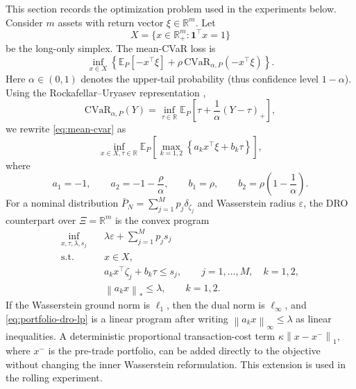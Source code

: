 \documentclass[11pt]{article}
\newcommand{\R}{\mathbb{R}}
\newcommand{\E}{\mathbb{E}}
\newcommand{\XiSet}{\Xi}
\newcommand{\1}{\mathbf{1}}
\newcommand{\Pbar}{\bar P_N}
\newcommand{\norm}[1]{\left\lVert #1\right\rVert}
\begin{document}
This section records the optimization problem used in the experiments below. Consider $m$ assets with return vector $\xi\in\R^m$. Let
\begin{equation}
    X=\{x\in\R_+^m:\mathbf 1^\top x=1\}
\end{equation}
be the long-only simplex. The mean-CVaR loss is
\begin{equation}\label{eq:mean-cvar}
\inf_{x\in X}\left\{\E_P[-x^\top\xi]+\rho\,\mathrm{CVaR}_{\alpha,P}(-x^\top\xi)\right\}.
\end{equation}
Here $\alpha\in(0,1)$ denotes the upper-tail probability (thus confidence level $1-\alpha$). Using the Rockafellar--Uryasev representation \citep{rockafellar2000optimization},
\begin{equation}
\mathrm{CVaR}_{\alpha,P}(Y)=\inf_{\tau\in\R}\E_P\left[\tau+\frac1\alpha(Y-\tau)_+\right],
\end{equation}
we rewrite \eqref{eq:mean-cvar} as
\begin{equation}\label{eq:portfolio-loss}
\inf_{x\in X,\tau\in\R}\E_P\left[\max_{k=1,2}\left\{a_k x^\top\xi+b_k\tau\right\}\right],
\end{equation}
where
\begin{equation}
    a_1=-1,
    \qquad
    a_2=-1-\frac{\rho}{\alpha},
    \qquad
    b_1=\rho,
    \qquad
    b_2=\rho\left(1-\frac1\alpha\right).
\end{equation}
For a nominal distribution $\Pbar=\sum_{j=1}^Mp_j\delta_{\zeta_j}$ and Wasserstein radius $\varepsilon$, the DRO counterpart over $\XiSet=\R^m$ is the convex program
\begin{equation}\label{eq:portfolio-dro-lp}
\begin{aligned}
\inf_{x,\tau,\lambda,s_j}\quad
&\lambda\varepsilon+\sum_{j=1}^Mp_js_j\\
\mathrm{s.t.}\quad
&x\in X,\\
&a_k x^\top\zeta_j+b_k\tau\le s_j,
\qquad j=1,\ldots,M,\quad k=1,2,\\
&\norm{a_kx}_*\le\lambda,
\qquad k=1,2.
\end{aligned}
\end{equation}
If the Wasserstein ground norm is $\ell_1$, then the dual norm is $\ell_\infty$, and \eqref{eq:portfolio-dro-lp} is a linear program after writing $\norm{a_kx}_\infty\le\lambda$ as linear inequalities. A deterministic proportional transaction-cost term $\kappa\norm{x-x^-}_1$, where $x^-$ is the pre-trade portfolio, can be added directly to the objective without changing the inner Wasserstein reformulation. This extension is used in the rolling experiment.
\end{document}
